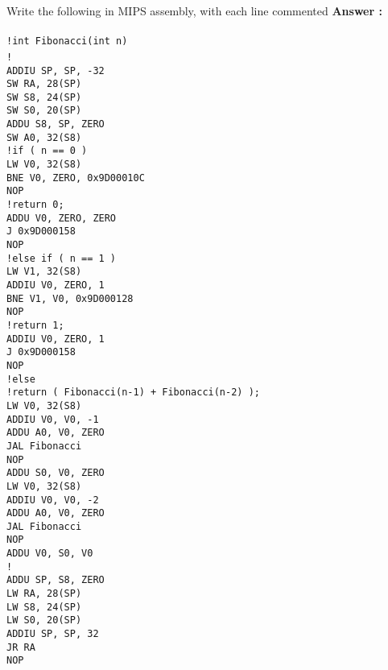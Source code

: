 \documentclass[a4paper,11pt]{article}
\newcommand{\answer}{\textbf{Answer : }}
\begin{document}
\item Write the following in MIPS assembly, with each line commented
\answer \\
\texttt{
\\ !int Fibonacci(int n)
\\ !{
\\ ADDIU SP, SP, -32
\\ SW RA, 28(SP)
\\ SW S8, 24(SP)
\\ SW S0, 20(SP)
\\ ADDU S8, SP, ZERO
\\ SW A0, 32(S8)
\\ !if ( n == 0 )
\\ LW V0, 32(S8)
\\ BNE V0, ZERO, 0x9D00010C
\\ NOP}
\texttt{
\\ !return 0;
\\ ADDU V0, ZERO, ZERO
\\ J 0x9D000158
\\ NOP
\\ !else if ( n == 1 )
\\ LW V1, 32(S8)
\\ ADDIU V0, ZERO, 1
\\ BNE V1, V0, 0x9D000128
\\ NOP
\\ !return 1;
\\ ADDIU V0, ZERO, 1
\\ J 0x9D000158
\\ NOP }
\texttt{
\\ !else
\\ !return ( Fibonacci(n-1) + Fibonacci(n-2) );
\\ LW V0, 32(S8)
\\ ADDIU V0, V0, -1
\\ ADDU A0, V0, ZERO
\\ JAL Fibonacci
\\ NOP
\\ ADDU S0, V0, ZERO
\\ LW V0, 32(S8)
\\ ADDIU V0, V0, -2
\\ ADDU A0, V0, ZERO
\\ JAL Fibonacci
\\ NOP
\\ ADDU V0, S0, V0
\\ !}
\\ ADDU SP, S8, ZERO
\\ LW RA, 28(SP)
\\ LW S8, 24(SP)
\\ LW S0, 20(SP)
\\ ADDIU SP, SP, 32
\\ JR RA
\\ NOP
}
\end{document}
